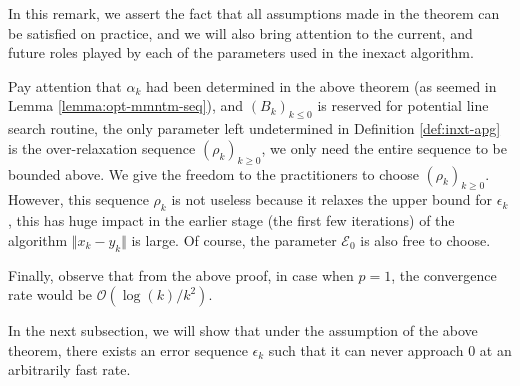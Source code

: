\documentclass[12pt]{article}
\begin{document}
        \begin{remark}
            In this remark, we assert the fact that all assumptions made in the theorem can be satisfied on practice, and we will also bring attention to the current, and future roles played by each of the parameters used in the inexact algorithm. 
            \par
            Pay attention that $\alpha_k$ had been determined in the above theorem (as seemed in Lemma \ref{lemma:opt-mmntm-seq}), and $(B_k)_{k \le 0}$ is reserved for potential line search routine, the only parameter left undetermined in Definition \ref{def:inxt-apg} is the over-relaxation sequence $(\rho_k)_{k \ge 0}$, we only need the entire sequence to be bounded above. 
            We give the freedom to the practitioners to choose $(\rho_k)_{k \ge 0}$. 
            However, this sequence $\rho_k$ is not useless because it relaxes the upper bound for $\epsilon_k$, this has huge impact in the earlier stage (the first few iterations) of the algorithm $\Vert x_k - y_k\Vert$ is large. 
            Of course, the parameter $\mathcal E_0$ is also free to choose. 
            \par
            Finally, observe that from the above proof, in case when $p = 1$, the convergence rate would be $\mathcal O(\log(k)/k^2)$. 
        \end{remark}
        In the next subsection, we will show that under the assumption of the above theorem, there exists an error sequence $\epsilon_k$ such that it can never approach $0$ at an arbitrarily fast rate. 
\end{document}
